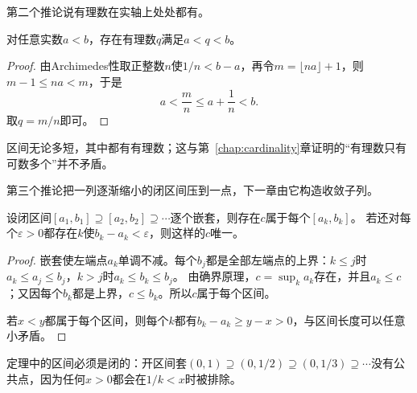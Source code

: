 第二个推论说有理数在实轴上处处都有。
\begin{theorem}[有理数的稠密性]
\label{thm:ru-rational-density}
对任意实数$a<b$，存在有理数$q$满足$a<q<b$。
\end{theorem}
\begin{proof}
由Archimedes性取正整数$n$使$1/n<b-a$，再令$m=\lfloor na\rfloor+1$，则$m-1\leq na<m$，于是
\[
 a<\frac mn\leq a+\frac1n<b.
\]
取$q=m/n$即可。
\end{proof}
区间无论多短，其中都有有理数；这与第~\ref{chap:cardinality}章证明的“有理数只有可数多个”并不矛盾。

第三个推论把一列逐渐缩小的闭区间压到一点，下一章由它构造收敛子列。
\begin{theorem}[闭区间套定理]
\label{thm:ru-nested-intervals}
设闭区间$[a_1,b_1]\supseteq[a_2,b_2]\supseteq\cdots$逐个嵌套，则存在$c$属于每个$[a_k,b_k]$。
若还对每个$\varepsilon>0$都存在$k$使$b_k-a_k<\varepsilon$，则这样的$c$唯一。
\end{theorem}
\begin{proof}
嵌套使左端点$a_k$单调不减。每个$b_j$都是全部左端点的上界：$k\leq j$时$a_k\leq a_j\leq b_j$，$k>j$时$a_k\leq b_k\leq b_j$。
由确界原理，$c=\sup_ka_k$存在，并且$a_k\leq c$；又因每个$b_k$都是上界，$c\leq b_k$。所以$c$属于每个区间。

若$x<y$都属于每个区间，则每个$k$都有$b_k-a_k\geq y-x>0$，与区间长度可以任意小矛盾。
\end{proof}
定理中的区间必须是闭的：开区间套$(0,1)\supseteq(0,1/2)\supseteq(0,1/3)\supseteq\cdots$没有公共点，因为任何$x>0$都会在$1/k<x$时被排除。

